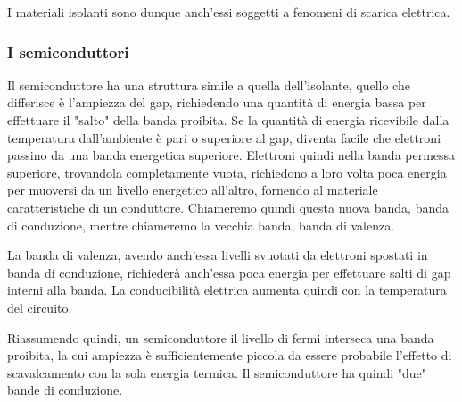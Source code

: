 \documentclass[../template]{subfiles}
\begin{document}
I materiali isolanti sono dunque anch'essi soggetti a fenomeni di scarica elettrica.

\subsubsection{I semiconduttori}
Il semiconduttore ha una struttura simile a quella dell'isolante, quello che differisce è l'ampiezza del gap, richiedendo una quantità di energia bassa per effettuare il "salto" della banda proibita.
Se la quantità di energia ricevibile dalla temperatura dall'ambiente è pari o superiore al gap, diventa facile che elettroni passino da una banda energetica superiore.
Elettroni quindi nella banda permessa superiore, trovandola completamente vuota, richiedono a loro volta poca energia per muoversi da un livello energetico all'altro, fornendo al materiale caratteristiche di un conduttore.
Chiameremo quindi questa nuova banda, banda di conduzione, mentre chiameremo la vecchia banda, banda di valenza.

La banda di valenza, avendo anch'essa livelli svuotati da elettroni spostati in banda di conduzione, richiederà anch'essa poca energia per effettuare salti di gap interni alla banda.
La conducibilità elettrica aumenta quindi con la temperatura del circuito.

Riassumendo quindi, un semiconduttore il livello di fermi interseca una banda proibita, la cui ampiezza è sufficientemente piccola da essere probabile l'effetto di scavalcamento con la sola energia termica.
Il semiconduttore ha quindi "due" bande di conduzione.
\end{document}
